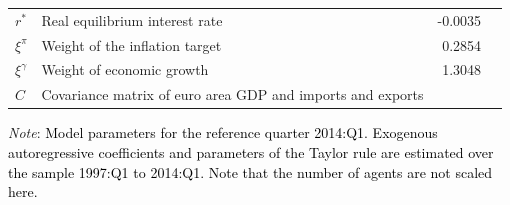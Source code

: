 \begin{table}[!htbp]
{\begin{tabular}{llrl}
			$r^{*}$ & Real equilibrium interest rate & -0.0035 & \\ 
			$\xi^{\pi}$ & Weight of the inflation target & 0.2854 & \\ 
			$\xi^{\gamma}$ & Weight of economic growth & 1.3048 & \\ 
			$C$ & Covariance matrix of euro area GDP and imports and exports & & \\ 
			\bottomrule
		\end{tabular}
	}
	\begin{tablenotes}
		\footnotesize \item \textit{Note}: \textcolor{black}{Model parameters for the reference quarter 2014:Q1. Exogenous autoregressive coefficients and parameters of the Taylor rule are estimated over the sample 1997:Q1 to 2014:Q1. Note that the number of agents are not scaled here.}
	\end{tablenotes}
\end{table}